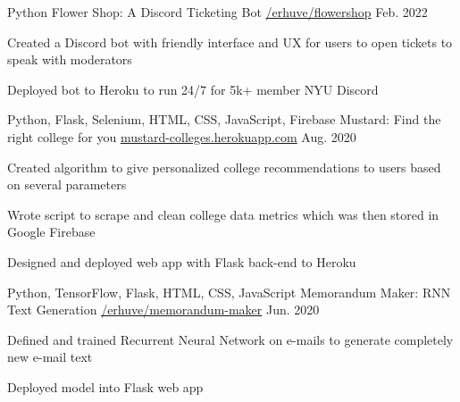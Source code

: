 

\begin{cventries}

  \cventry
    {Python} %
    {Flower Shop: A Discord Ticketing Bot} %
    {\href{https://github.com/erhuve/flowershop}{/erhuve/flowershop}} %
    {Feb. 2022} %
    {
      \begin{cvitems} %
        \item {Created a Discord bot with friendly interface and UX for users to open tickets to speak with moderators}
        \item {Deployed bot to Heroku to run 24/7 for 5k+ member NYU Discord}
      \end{cvitems}
    }

  \cventry
    {Python, Flask, Selenium, HTML, CSS, JavaScript, Firebase} %
    {Mustard: Find the right college for you} %
    {\href{http://mustard-colleges.herokuapp.com/}{mustard-colleges.herokuapp.com}} %
    {Aug. 2020} %
    {
      \begin{cvitems} %
        \item {Created algorithm to give personalized college recommendations to users based on several parameters}
        \item {Wrote script to scrape and clean college data metrics which was then stored in Google Firebase}
        \item {Designed and deployed web app with Flask back-end to Heroku}
      \end{cvitems}
    }

  \cventry
    {Python, TensorFlow, Flask, HTML, CSS, JavaScript} %
    {Memorandum Maker: RNN Text Generation} %
    {\href{https://github.com/erhuve/memorandum-maker}{/erhuve/memorandum-maker}} %
    {Jun. 2020} %
    {
      \begin{cvitems} %
        \item {Defined and trained Recurrent Neural Network on e-mails to generate completely new e-mail text}
        \item {Deployed model into Flask web app}
      \end{cvitems}
    }
\end{cventries}

